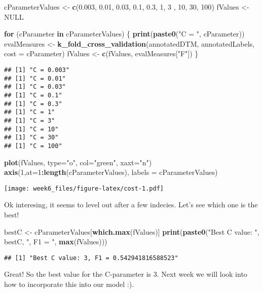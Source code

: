 \documentclass[
]{article}
\newenvironment{Shaded}{\begin{snugshade}}{\end{snugshade}}
\newcommand{\ControlFlowTok}[1]{\textcolor[rgb]{0.13,0.29,0.53}{\textbf{#1}}}
\newcommand{\DataTypeTok}[1]{\textcolor[rgb]{0.13,0.29,0.53}{#1}}
\newcommand{\DecValTok}[1]{\textcolor[rgb]{0.00,0.00,0.81}{#1}}
\newcommand{\FloatTok}[1]{\textcolor[rgb]{0.00,0.00,0.81}{#1}}
\newcommand{\KeywordTok}[1]{\textcolor[rgb]{0.13,0.29,0.53}{\textbf{#1}}}
\newcommand{\NormalTok}[1]{#1}
\newcommand{\OperatorTok}[1]{\textcolor[rgb]{0.81,0.36,0.00}{\textbf{#1}}}
\newcommand{\OtherTok}[1]{\textcolor[rgb]{0.56,0.35,0.01}{#1}}
\newcommand{\StringTok}[1]{\textcolor[rgb]{0.31,0.60,0.02}{#1}}
\begin{document}
\begin{Shaded}
\begin{Highlighting}[]
\NormalTok{cParameterValues <-}\StringTok{ }\KeywordTok{c}\NormalTok{(}\FloatTok{0.003}\NormalTok{, }\FloatTok{0.01}\NormalTok{, }\FloatTok{0.03}\NormalTok{, }\FloatTok{0.1}\NormalTok{, }\FloatTok{0.3}\NormalTok{, }\DecValTok{1}\NormalTok{, }\DecValTok{3}\NormalTok{ , }\DecValTok{10}\NormalTok{, }\DecValTok{30}\NormalTok{, }\DecValTok{100}\NormalTok{)}
\NormalTok{fValues <-}\StringTok{ }\OtherTok{NULL}

\ControlFlowTok{for}\NormalTok{ (cParameter }\ControlFlowTok{in}\NormalTok{ cParameterValues) \{}
  \KeywordTok{print}\NormalTok{(}\KeywordTok{paste0}\NormalTok{(}\StringTok{"C = "}\NormalTok{, cParameter))}
\NormalTok{  evalMeasures <-}\StringTok{ }\KeywordTok{k_fold_cross_validation}\NormalTok{(annotatedDTM, annotatedLabels, }\DataTypeTok{cost =}\NormalTok{ cParameter)}
\NormalTok{  fValues <-}\StringTok{ }\KeywordTok{c}\NormalTok{(fValues, evalMeasures[}\StringTok{"F"}\NormalTok{])}
\NormalTok{\}}
\end{Highlighting}
\end{Shaded}

\begin{verbatim}
## [1] "C = 0.003"
## [1] "C = 0.01"
## [1] "C = 0.03"
## [1] "C = 0.1"
## [1] "C = 0.3"
## [1] "C = 1"
## [1] "C = 3"
## [1] "C = 10"
## [1] "C = 30"
## [1] "C = 100"
\end{verbatim}

\begin{Shaded}
\begin{Highlighting}[]
\KeywordTok{plot}\NormalTok{(fValues, }\DataTypeTok{type=}\StringTok{"o"}\NormalTok{, }\DataTypeTok{col=}\StringTok{"green"}\NormalTok{, }\DataTypeTok{xaxt=}\StringTok{"n"}\NormalTok{)}
\KeywordTok{axis}\NormalTok{(}\DecValTok{1}\NormalTok{,}\DataTypeTok{at=}\DecValTok{1}\OperatorTok{:}\KeywordTok{length}\NormalTok{(cParameterValues), }\DataTypeTok{labels =}\NormalTok{ cParameterValues)}
\end{Highlighting}
\end{Shaded}

\texttt{[image: week6\_files/figure-latex/cost-1.pdf]}

Ok interesing, it seems to level out after a few indecies. Let's see
which one is the best!

\begin{Shaded}
\begin{Highlighting}[]
\NormalTok{bestC <-}\StringTok{ }\NormalTok{cParameterValues[}\KeywordTok{which.max}\NormalTok{(fValues)]}
\KeywordTok{print}\NormalTok{(}\KeywordTok{paste0}\NormalTok{(}\StringTok{"Best C value: "}\NormalTok{, bestC, }\StringTok{", F1 = "}\NormalTok{, }\KeywordTok{max}\NormalTok{(fValues)))}
\end{Highlighting}
\end{Shaded}

\begin{verbatim}
## [1] "Best C value: 3, F1 = 0.542941816588523"
\end{verbatim}

Great! So the best value for the C-parameter is 3. Next week we will
look into how to incorporate this into our model :).
\end{document}

